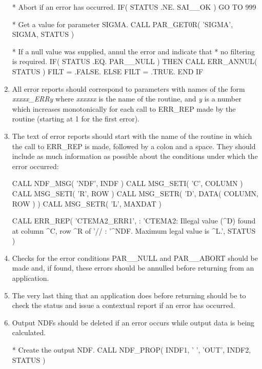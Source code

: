 \documentclass[twoside,11pt,nolof]{starlink}
\begin{document}
\begin{enumerate}
\begin{terminalv}
*  Abort if an error has occurred.
     IF( STATUS .NE. SAI__OK ) GO TO 999

*  Get a value for parameter SIGMA.
     CALL PAR_GET0R( 'SIGMA', SIGMA, STATUS )

*  If a null value was supplied, annul the error and indicate that
*  no filtering is required.
     IF( STATUS .EQ. PAR__NULL ) THEN
        CALL ERR_ANNUL( STATUS )
        FILT = .FALSE.
     ELSE
        FILT = .TRUE.
     END IF
\end{terminalv}
\normalsize

\item All error reports should correspond to parameters with names of the form
\emph{xxxxx\_ERRy} where \emph{xxxxxx} is the name of the routine, and \emph{y} is
a number which increases monotonically for each call to {\small ERR\_REP} made
by the routine (starting at 1 for the first error).

\item The text of error reports should start with the name of the routine in
which the call to {\small ERR\_REP} is made, followed by a colon and a space.
They should include as much information as possible about the conditions under
which the error occurred:

\small
\begin{terminalv}
   CALL NDF_MSG( 'NDF', INDF )
   CALL MSG_SETI( 'C', COLUMN )
   CALL MSG_SETI( 'R', ROW )
   CALL MSG_SETR( 'D', DATA( COLUMN, ROW ) )
   CALL MSG_SETR( 'L', MAXDAT )

   CALL ERR_REP( 'CTEMA2_ERR1',
: 'CTEMA2: Illegal value (^D) found at column ^C, row ^R of '//
: '^NDF. Maximum legal value is ^L.', STATUS )
\end{terminalv}
\normalsize

\item Checks for the error conditions {\small PAR\_\_NULL} and {\small
PAR\_\_ABORT} should be made and, if found, these errors should be annulled
before returning from an application.

\item The very last thing that an application does before returning should be to
check the status and issue a contextual report if an error has occurred.

\item Output {\small NDF}s should be deleted if an error occurs while output
data is being calculated.

\small
\begin{terminalv}
*  Create the output NDF.
      CALL NDF_PROP( INDF1, ' ', 'OUT', INDF2, STATUS )


\end{terminalv}
\end{enumerate}
\end{document}
